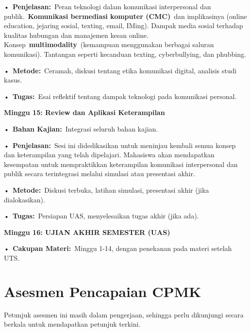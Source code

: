 \documentclass[
  letterpaper,
  DIV=11,
  numbers=noendperiod]{scrreprt}
\begin{document}
•~\textbf{Penjelasan:}~Peran teknologi dalam komunikasi interpersonal
dan publik.~\textbf{Komunikasi bermediasi komputer (CMC)}~dan
implikasinya (online education, jejaring sosial, texting, email, IMing).
Dampak media sosial terhadap kualitas hubungan dan manajemen kesan
online. Konsep~\textbf{multimodality}~(kemampuan menggunakan berbagai
saluran komunikasi). Tantangan seperti kecanduan texting, cyberbullying,
dan phubbing.

•~\textbf{Metode:}~Ceramah, diskusi tentang etika komunikasi digital,
analisis studi kasus.

•~\textbf{Tugas:}~Esai reflektif tentang dampak teknologi pada
komunikasi personal.

\textbf{Minggu 15: Review dan Aplikasi Keterampilan}

•~\textbf{Bahan Kajian:}~Integrasi seluruh bahan kajian.

•~\textbf{Penjelasan:}~Sesi ini didedikasikan untuk meninjau kembali
semua konsep dan keterampilan yang telah dipelajari. Mahasiswa akan
mendapatkan kesempatan untuk mempraktikkan keterampilan komunikasi
interpersonal dan publik secara terintegrasi melalui simulasi atau
presentasi akhir.

•~\textbf{Metode:}~Diskusi terbuka, latihan simulasi, presentasi akhir
(jika dialokasikan).

•~\textbf{Tugas:}~Persiapan UAS, menyelesaikan tugas akhir (jika ada).

\textbf{Minggu 16: UJIAN AKHIR SEMESTER (UAS)}

•~\textbf{Cakupan Materi:}~Minggu 1-14, dengan penekanan pada materi
setelah UTS.


\chapter*{Asesmen Pencapaian CPMK}\label{asesmen-pencapaian-cpmk}


\begin{tcolorbox}[enhanced jigsaw, breakable, rightrule=.15mm, colbacktitle=quarto-callout-warning-color!10!white, opacityback=0, titlerule=0mm, leftrule=.75mm, bottomrule=.15mm, toptitle=1mm, colframe=quarto-callout-warning-color-frame, bottomtitle=1mm, arc=.35mm, coltitle=black, opacitybacktitle=0.6, toprule=.15mm, left=2mm, title=\textcolor{quarto-callout-warning-color}{\faExclamationTriangle}\hspace{0.5em}{Warning}, colback=white]

Petunjuk asesmen ini masih dalam pengerjaan, sehingga perlu dikunjungi
secara berkala untuk mendapatkan petunjuk terkini.

\end{tcolorbox}
\end{document}
